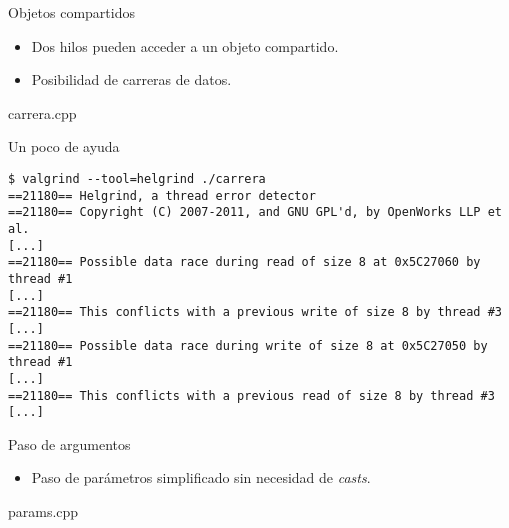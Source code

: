 \begin{frame}[fragile]{Objetos compartidos}
\begin{itemize}
  \item Dos hilos pueden acceder a un objeto compartido.
  \item Posibilidad de carreras de datos.
\end{itemize}
\begin{block}{carrera.cpp}

\end{block}
\end{frame}

\begin{frame}[fragile]{Un poco de ayuda}
\begin{lstlisting}[style=terminal]
$ valgrind --tool=helgrind ./carrera
==21180== Helgrind, a thread error detector
==21180== Copyright (C) 2007-2011, and GNU GPL'd, by OpenWorks LLP et al.
[...]
==21180== Possible data race during read of size 8 at 0x5C27060 by thread #1
[...]
==21180== This conflicts with a previous write of size 8 by thread #3
[...]
==21180== Possible data race during write of size 8 at 0x5C27050 by thread #1
[...]
==21180== This conflicts with a previous read of size 8 by thread #3
[...]
\end{lstlisting}
\end{frame}

\begin{frame}[t]{Paso de argumentos}
\begin{itemize}
  \item Paso de parámetros simplificado sin necesidad de \emph{casts}.
\end{itemize}
\begin{block}{params.cpp}

\end{block}
\end{frame}
